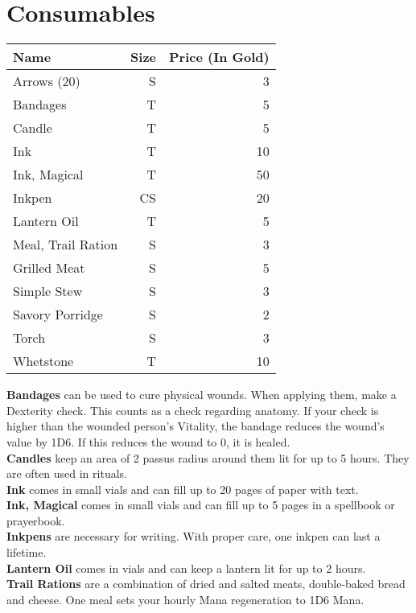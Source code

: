 \section{Consumables}
\begin{longtable}{l | r | r}
	Name & Size & Price (In Gold)\\ \hline
	Arrows (20) & S & 3\\
	Bandages & T & 5\\
	Candle & T & 5\\
	Ink & T & 10\\
	Ink, Magical & T & 50\\
	Inkpen & CS & 20\\
	Lantern Oil & T & 5\\
	Meal, Trail Ration & S & 3\\
	Grilled Meat & S & 5\\
	Simple Stew & S & 3\\
	Savory Porridge & S & 2\\
	Torch & S & 3\\
	Whetstone & T & 10\\
\end{longtable}


\textbf{Bandages} can be used to cure physical wounds. When applying them, make a Dexterity check. This counts as a check regarding anatomy. If your check is higher than the wounded person's Vitality, the bandage reduces the wound's value by 1D6. If this reduces the wound to 0, it is healed.\\


\textbf{Candles} keep an area of 2 passus radius around them lit for up to 5 hours. They are often used in rituals.\\


\textbf{Ink} comes in small vials and can fill up to 20 pages of paper with text.\\

\textbf{Ink, Magical} comes in small vials and can fill up to 5 pages in a spellbook or prayerbook.\\


\textbf{Inkpens} are necessary for writing. With proper care, one inkpen can last a lifetime.\\


\textbf{Lantern Oil} comes in vials and can keep a lantern lit for up to 2 hours.\\


\textbf{Trail Rations} are a combination of dried and salted meats, double-baked bread and cheese. One meal sets your hourly Mana regeneration to 1D6 Mana.\\



